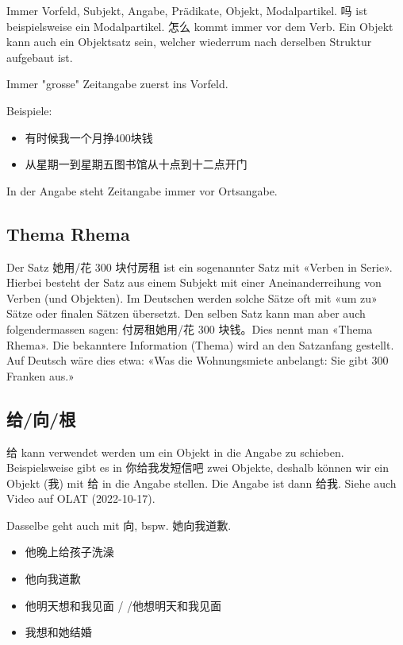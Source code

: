 \documentclass[UTF8]{ctexart}
\begin{document}
Immer Vorfeld, Subjekt, Angabe, Prädikate, Objekt, Modalpartikel.
吗 ist beispielsweise ein Modalpartikel. 怎么 kommt immer vor dem Verb. Ein Objekt kann auch ein Objektsatz sein, welcher wiederrum nach derselben Struktur aufgebaut ist.

Immer "grosse" Zeitangabe zuerst ins Vorfeld.

Beispiele:

\begin{itemize}
    \item 有时候我一个月挣400块钱
    \item 从星期一到星期五图书馆从十点到十二点开门
\end{itemize}

In der Angabe steht Zeitangabe immer vor Ortsangabe.

\subsection{Thema Rhema}

Der Satz 她用/花 300 块付房租 ist ein sogenannter Satz mit «Verben in Serie». Hierbei besteht der Satz aus einem Subjekt mit einer Aneinanderreihung von Verben (und Objekten). Im Deutschen werden solche Sätze oft mit «um zu» Sätze oder finalen Sätzen übersetzt. Den selben Satz kann man aber auch folgendermassen sagen: 付房租她用/花 300 块钱。Dies nennt man «Thema Rhema». Die bekanntere Information
(Thema) wird an den Satzanfang gestellt. Auf Deutsch wäre dies etwa: «Was die Wohnungsmiete anbelangt: Sie gibt 300 Franken aus.»

\subsection{给/向/根}

给 kann verwendet werden um ein Objekt in die Angabe zu schieben. Beispielsweise gibt es in 你给我发短信吧 zwei Objekte, deshalb können wir ein Objekt (我) mit 给 in die Angabe stellen. Die Angabe ist dann 给我. Siehe auch Video auf OLAT (2022-10-17).

Dasselbe geht auch mit 向, bspw. 她向我道歉.

\begin{itemize}
    \item 他晚上给孩子洗澡
    \item 他向我道歉
    \item 他明天想和我见面 / /他想明天和我见面
    \item 我想和她结婚
\end{itemize}
\end{document}
